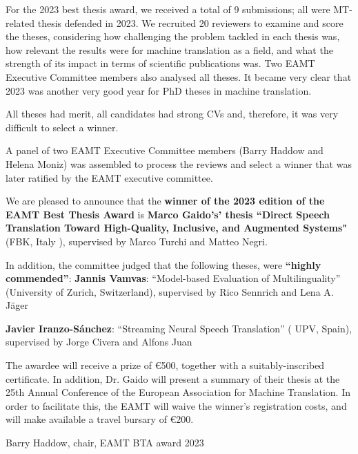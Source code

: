 For the 2023 best thesis award, we received a total of 9 submissions; all were MT-related thesis defended in 2023.  We recruited 20 reviewers to examine and score the theses, considering how challenging the problem tackled in each thesis was, how relevant the results were for machine translation as a field, and what the strength of its impact in terms of scientific publications was. Two EAMT Executive Committee members also analysed all theses. It became very clear that 2023 was another very good year for PhD theses in machine translation. 

All theses had merit, all candidates had strong CVs and, therefore, it was very difficult to select a winner.

A panel of two EAMT Executive Committee members (Barry Haddow and Helena Moniz) was assembled to process the reviews and select a winner that was later ratified by the EAMT executive committee.

We are pleased to announce that the {\bf winner of the 2023 edition of the EAMT Best Thesis Award} is {\bf Marco Gaido’s' thesis “Direct Speech Translation Toward High-Quality, Inclusive, and Augmented Systems"} (FBK, Italy ), supervised by Marco Turchi and Matteo Negri.

In addition, the committee judged  that the following theses, were {\bf “highly commended”}:
{\bf Jannis Vamvas}: “Model-based Evaluation of Multilinguality” (University of Zurich, Switzerland), supervised by Rico Sennrich and Lena A. Jäger

{\bf Javier Iranzo-Sánchez}: “Streaming Neural Speech Translation” ( UPV, Spain), supervised by Jorge Civera and Alfons Juan 


The awardee will receive a prize of €500, together with a suitably-inscribed certificate. In addition, Dr. Gaido will present a summary of their thesis at the 25th Annual Conference of the European Association for Machine Translation.  In order to facilitate this, the EAMT will waive the winner's registration costs, and will make available a travel bursary of €200.


\bigbreak

Barry Haddow, chair, EAMT BTA award 2023
